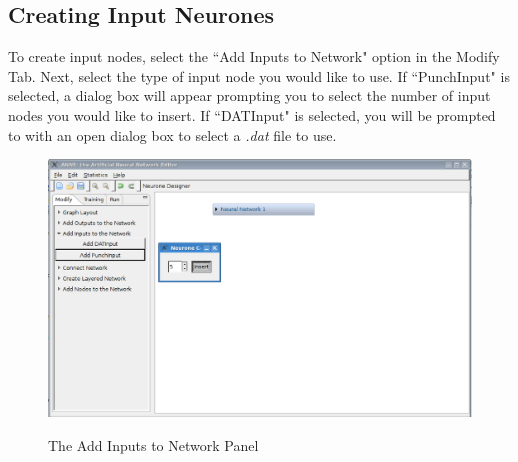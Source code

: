 \documentclass[11pt]{report}
\begin{document}
\subsection{Creating Input Neurones}
{
To create input nodes, select the ``Add Inputs to Network" option in the Modify Tab. Next, select the type of input node you would like to use. If ``PunchInput" is selected, a dialog box will appear prompting you to select the number of input nodes you would like to insert. If ``DATInput" is selected, you will be prompted to with an open dialog box to select a {\textit{.dat}} file to use.

\begin{figure}[t]
\centering
\scalebox{0.4} {
	\includegraphics{addInput}
}
\caption{The Add Inputs to Network Panel}
\label{fig:addinputs}
\end{figure}
}
\newpage
\end{document}
